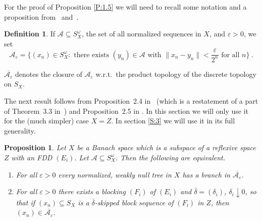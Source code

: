 \documentclass[11pt,leqno]{amsart}
\newtheorem{prop}[thm]{Proposition}
\theoremstyle{definition}
\newtheorem*{defin}{Definition}
\newcommand{\cA}{\mathcal{A}}
\newcommand{\vp}{\varepsilon}
\newcommand{\deltab}{\overline\delta}
\begin{document}
For the proof of Proposition \ref{P:1.5} we will need to recall some
notation and a proposition from~\cite{OS1} and~\cite{OS2}.

\begin{defin}
If $\cA \subseteq S_X^\omega$, the set of all normalized sequences in $X$, and
$\vp >0$, we set
$$\cA_\vp = \{(x_n)\in S_X^\omega :\text{ there exists } (y_n) \in \cA
\text{ with } \|x_n-y_n\| < \frac{\vp}{2^n}\text{ for all } n\}\ .$$
\end{defin}


\noindent
$\overline{\cA_\vp}$ denotes the closure
of $\cA_\vp$ w.r.t.\ the product topology of the
discrete topology on $S_X$.

The next result follows from Proposition~2.4 in~\cite{OS2} (which is a
restatement of a part of Theorem~3.3 in~\cite{OS1}) and
Proposition~2.5 in \cite{OS2}. In this section we will only use it for
the (much simpler) case $X=Z$. In section \ref{S:3} we will use it in
its full generality.
\begin{prop}\label{P:3.3}
  Let $X$ be a Banach space which is a subspace of a reflexive space
  $Z$ with an FDD $(E_i)$. Let $\cA\subseteq S_X^\omega$. Then the
  following are equivalent.
  \begin{enumerate}
  \item[{a)}] For all $\vp>0$ every normalized, weakly null tree in
    $X$ has a branch in $\overline{\cA_\vp}$.
  \item[{b)}]  For all $\vp>0$ there exists a blocking $(F_i)$ of $(E_i)$
    and $\deltab = (\delta_i)$, $\delta_i\downarrow 0$, so that if
    $(x_n) \subseteq S_X$ is a $\deltab$-skipped block sequence of
    $(F_i)$ in $Z$,
    then $(x_n) \in \overline{\cA_\vp}$.
  \end{enumerate}
\end{prop}
\end{document}
